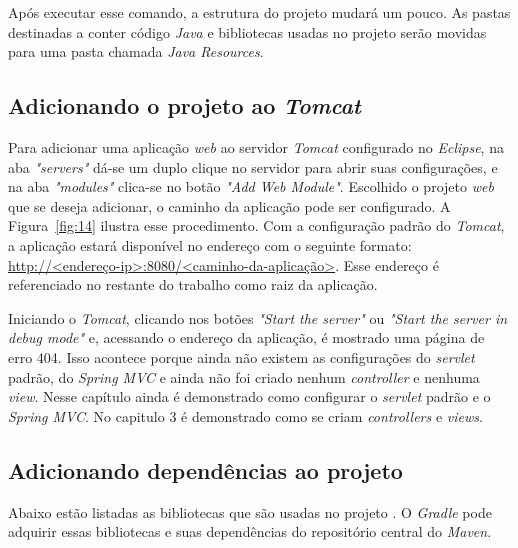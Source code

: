 Após executar esse comando, a estrutura do projeto mudará um pouco. As pastas destinadas a conter código \textit{Java} e bibliotecas usadas no projeto serão movidas para uma pasta chamada \textit{Java Resources}.

\subsection{Adicionando o projeto ao \textit{Tomcat}}

Para adicionar uma aplicação \textit{web} ao servidor \textit{Tomcat} configurado no \textit{Eclipse}, na aba \textit{"servers"} dá-se um duplo clique no servidor para abrir suas configurações, e na aba \textit{"modules"} clica-se no botão \textit{"Add Web Module"}. Escolhido o projeto \textit{web} que se deseja adicionar, o caminho da aplicação pode ser configurado. A Figura~\ref{fig:14} ilustra esse procedimento. Com a configuração padrão do \textit{Tomcat}, a aplicação estará disponível no endereço com o seguinte formato: \url{http://<endereço-ip>:8080/<caminho-da-aplicação>}. Esse endereço é referenciado no restante do trabalho como raiz da aplicação.

Iniciando o \textit{Tomcat}, clicando nos botões \textit{"Start the server"} ou \textit{"Start the server in debug mode"} e, acessando o endereço da aplicação, é mostrado uma página de erro 404. Isso acontece porque ainda não existem as configurações do \textit{servlet} padrão, do \textit{Spring MVC} e ainda não foi criado nenhum \textit{controller} e nenhuma \textit{view}. Nesse capítulo ainda é demonstrado como configurar o \textit{servlet} padrão e o \textit{Spring MVC}. No capitulo 3 é demonstrado como se criam \textit{controllers} e \textit{views}.


\subsection{Adicionando dependências ao projeto}

Abaixo estão listadas as bibliotecas que são usadas no projeto \spring. O \textit{Gradle} pode adquirir essas bibliotecas e suas dependências do repositório central do \textit{Maven}.

